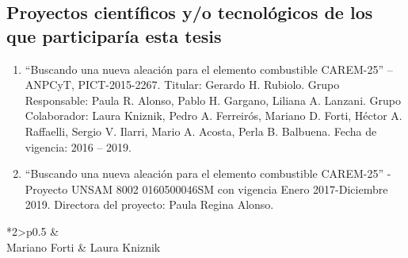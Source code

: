 \subsection{ Proyectos científicos y/o tecnológicos de los que participaría esta tesis  }

\begin{enumerate}


\item ``Buscando una nueva aleación para el elemento combustible CAREM-25'' – 
ANPCyT, PICT-2015-2267. Titular: Gerardo H. Rubiolo. Grupo Responsable: Paula 
R. Alonso, Pablo H. Gargano, Liliana A. Lanzani. Grupo Colaborador: Laura 
Kniznik, Pedro A. Ferreirós, Mariano D. Forti, Héctor A. Raffaelli, Sergio V. 
Ilarri, Mario A. Acosta, Perla B. Balbuena. Fecha de vigencia: 2016 – 2019.

\item 
  ``Buscando una nueva aleación para el elemento combustible CAREM-25'' - 
Proyecto UNSAM 8002 0160500046SM con vigencia Enero 2017-Diciembre 2019. 
Directora del proyecto: Paula Regina Alonso.

\end{enumerate}






\begin{table}[h!]
  \begin{tabular*}{\textwidth}{ *{2}{>\centering p{0.5\textwidth} } }
    &\\
    \hline
    Mariano Forti & Laura Kniznik
  \end{tabular*}
\end{table}


